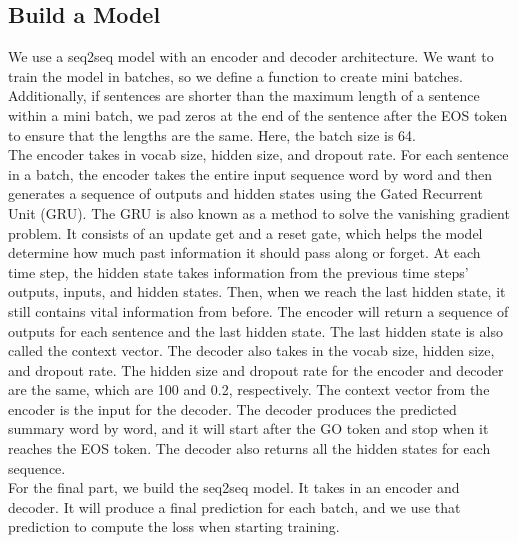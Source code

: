 \documentclass[conference]{IEEEtran}
\begin{document}
\subsection{Build a Model}
\indent We use a seq2seq model with an encoder and decoder architecture. We want to train the model in batches, so we define a function to create mini batches. Additionally, if sentences are shorter than the maximum length of a sentence within a mini batch, we pad zeros at the end of the sentence after the EOS token to ensure that the lengths are the same. Here, the batch size is 64. \\
\indent The encoder takes in vocab size, hidden size, and dropout rate. For each sentence in a batch, the encoder takes the entire input sequence word by word and then generates a sequence of outputs and hidden states using the Gated Recurrent Unit (GRU). The GRU is also known as a method to solve the vanishing gradient problem. It consists of an update get and a reset gate, which helps the model determine how much past information it should pass along or forget. At each time step, the hidden state takes information from the previous time steps’ outputs, inputs, and hidden states. Then, when we reach the last hidden state, it still contains vital information from before. The encoder will return a sequence of outputs for each sentence and the last hidden state. The last hidden state is also called the context vector. The decoder also takes in the vocab size, hidden size, and dropout rate. The hidden size and dropout rate for the encoder and decoder are the same, which are 100 and 0.2, respectively. The context vector from the encoder is the input for the decoder. The decoder produces the predicted summary word by word, and it will start after the GO token and stop when it reaches the EOS token. The decoder also returns all the hidden states for each sequence. \\
\indent For the final part, we build the seq2seq model. It takes in an encoder and decoder. It will produce a final prediction for each batch, and we use that prediction to compute the loss when starting training. 
\end{document}
